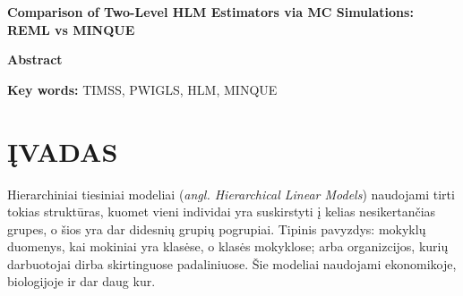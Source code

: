 \documentclass[11pt,a4paper]{article}
\begin{document}
\begin{center}{\large\textbf{Comparison of Two-Level HLM Estimators via MC Simulations: REML vs MINQUE}}\end{center}

\begin{small}
\vspace{2\baselineskip}
\begin{center}\textbf{Abstract}\end{center}


\vspace{\baselineskip}

\noindent\textbf{Key words:}
TIMSS, PWIGLS, HLM, MINQUE
\end{small}
\vspace{\baselineskip}

\newpage
\section{ĮVADAS}

\indent Hierarchiniai tiesiniai modeliai (\textit{angl. Hierarchical Linear Models}) naudojami tirti tokias struktūras, kuomet vieni individai yra suskirstyti į kelias nesikertančias grupes, o šios yra dar didesnių grupių pogrupiai. Tipinis pavyzdys: mokyklų duomenys, kai mokiniai yra klasėse, o klasės mokyklose; arba organizcijos, kurių darbuotojai dirba skirtinguose padaliniuose. Šie modeliai naudojami ekonomikoje, biologijoje ir dar daug kur.\cite{cek}
\end{document}
